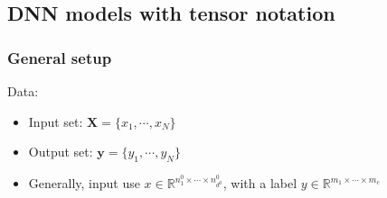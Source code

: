 \subsection{DNN models with tensor notation}
\subsubsection{General setup}
Data:
	\begin{itemize}
		\item Input set: $\bm{X} = \{x_1, \cdots, x_N\}$
		\item Output set: $\bm{y} =  \{y_1, \cdots, y_N\}$
		\item Generally,  input use $x \in \mathbb{R}^{ n^0_1\times \cdots \times n^0_{d^0} }$, with a label $y \in \mathbb{R}^{m_1 \times \cdots \times m_c}$
	\end{itemize}


